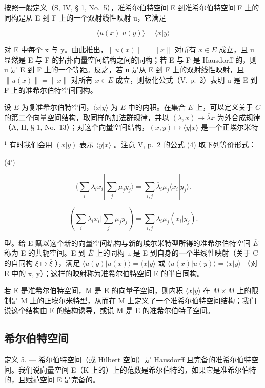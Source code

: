 按照一般定义（S, IV, § 1, No.~5），准希尔伯特空间 E 到准希尔伯特空间 F 上的同构是从 E 到 F 上的一个双射线性映射 u，它满足

\[
\langle u (x) | u (y) \rangle = \langle x | y \rangle\tag{10}
\]

对 E 中每个 x 与 y。由此推出，\(\|u(x)\| = \|x\|\) 对所有 \(x \in E\) 成立，且 u 显然是 E 与 F 的拓扑向量空间结构之间的同构；若 E 与 F 是 Hausdorff 的，则 u 是 E 到 F 上的一个等距。反之，若 u 是从 E 到 F 上的双射线性映射，且 \(\|u(x)\| = \|x\|\) 对所有 \(x \in E\) 成立，则极化公式（V, p.~2）表明 u 是 E 到 F 上的准希尔伯特空间同构。

设 \(E\) 为复准希尔伯特空间，\(\langle x|y\rangle\) 为 \(E\) 中的内积。在集合 \(E\) 上，可以定义关于 \(C\) 的第二个向量空间结构，取同样的加法群规律，并以 \((\lambda, x) \mapsto \overline{\lambda}x\) 为外合成规律（A, II, § 1, No.~13）；对这个向量空间结构，\((x, y) \mapsto \langle y|x\rangle\) 是一个正埃尔米特

\(^{1}\) 有时我们会用 \((x|y)\) 表示 \(\langle y|x\rangle\) 。注意 V, p.~2 的公式 (4) 取下列等价形式：

(4')

\[
\langle \sum_ {i} \lambda_ {i} x _ {i} | \sum_ {j} \mu_ {j} y _ {j} \rangle = \sum_ {i, j} \overline {{{{\lambda}}}} _ {i} \mu_ {j} \langle x _ {i} | y _ {j} \rangle .\tag{4"}
\]

\[
(\sum_ {i} \lambda_ {i} x _ {i} | \sum_ {j} \mu_ {j} y _ {j}) = \sum_ {i, j} \lambda_ {i} \overline {{\mu}} _ {j} (x _ {i} | y _ {j}).
\]

型。给 E 赋以这个新的向量空间结构与新的埃尔米特型所得的准希尔伯特空间 \(\overline{E}\) 称为 E 的共轭空间。E 到 \(\overline{E}\) 上的同构 u 是 E 到自身的一个半线性映射（关于 C 的自同构 \(\xi \mapsto \overline{\xi}\) ），满足 \(\langle u(y)|u(x)\rangle = \langle x|y\rangle\) 或 \(\langle u(x)|u(y)\rangle = \overline{\langle x|y\rangle}\) （对 E 中的 x, y）；这样的映射称为准希尔伯特空间 E 的半自同构。

若 E 是准希尔伯特空间，M 是 E 的向量子空间，则内积 \(\langle x|y\rangle\) 在 \(M \times M\) 上的限制是 M 上的正埃尔米特型，从而在 M 上定义了一个准希尔伯特空间结构；我们说这个结构由 E 的结构诱导，或说 M 是 E 的准希尔伯特子空间。

\subsection{希尔伯特空间}

定义 5. --- 希尔伯特空间（或 Hilbert 空间）是 Hausdorff 且完备的准希尔伯特空间。我们说向量空间 E（K 上的）上的范数是希尔伯特的，如果它是准希尔伯特的，且赋范空间 E 是完备的。

